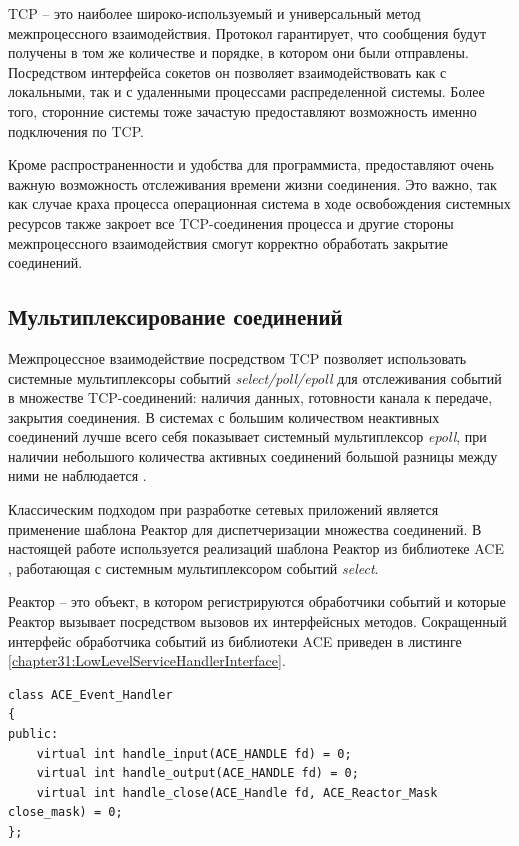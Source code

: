 TCP -- это наиболее широко-используемый и универсальный метод межпроцессного взаимодействия. Протокол гарантирует, что сообщения будут получены в том же количестве и порядке, в котором они были отправлены. Посредством интерфейса сокетов он позволяет взаимодействовать как с локальными, так и с удаленными процессами распределенной системы. Более того, сторонние системы тоже зачастую предоставляют возможность именно подключения по TCP.

Кроме распространенности и удобства для программиста, предоставляют очень важную возможность отслеживания времени жизни соединения. Это важно, так как случае краха процесса операционная система в ходе освобождения системных ресурсов также закроет все TCP-соединения процесса и другие стороны межпроцессного взаимодействия смогут корректно обработать закрытие соединений.

\subsection{Мультиплексирование соединений}

Межпроцессное взаимодействие посредством TCP позволяет использовать системные мультиплексоры событий \textit{select/poll/epoll} для отслеживания событий в множестве TCP-соединений: наличия данных, готовности канала к передаче, закрытия соединения. В системах с большим количеством неактивных соединений лучше всего себя показывает системный мультиплексор \textit{epoll}, при наличии небольшого количества активных соединений большой разницы между ними не наблюдается \cite{MuxComparison}.

Классическим подходом при разработке сетевых приложений является применение шаблона Реактор \cite{schmidt1995reactor, 10.1145/1808954.1808964} для диспетчеризации множества соединений. В настоящей работе используется реализаций шаблона Реактор из библиотеке ACE \cite{ACE}, работающая с системным мультиплексором событий \textit{select}.

Реактор -- это объект, в котором регистрируются обработчики событий и которые Реактор вызывает посредством вызовов их интерфейсных методов. Сокращенный интерфейс обработчика событий из библиотеки ACE приведен в листинге \ref{chapter31:LowLevelServiceHandlerInterface}.
\begin{lstlisting}[float=!h,caption={Интерфейс низкоуровневого обработчика соединений на C++},label={chapter31:LowLevelServiceHandlerInterface}]
class ACE_Event_Handler
{
public:
	virtual int handle_input(ACE_HANDLE fd) = 0;
	virtual int handle_output(ACE_HANDLE fd) = 0;
	virtual int handle_close(ACE_Handle fd, ACE_Reactor_Mask close_mask) = 0;
};
\end{lstlisting}

